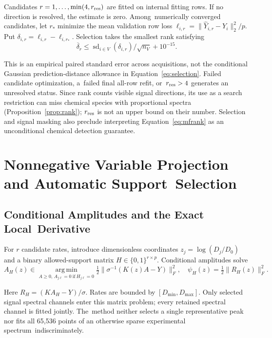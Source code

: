 \documentclass[mathematics,article,accept,moreauthors]{Definitions/mdpi}
\newcommand{\argmin}{\operatorname*{arg\,min}}
\begin{document}
Candidates $r=1,\ldots,\min(4,r_{\rm res})$ are fitted on internal fitting rows. If no direction is resolved, the estimate is zero. Among~numerically converged candidates, let $r_*$ minimize the mean validation row loss $\ell_{i,r}=\|\widehat Y_{i,r}-Y_i\|_2^2/p$. Put $\delta_{i,r}=\ell_{i,r}-\ell_{i,r_*}$. Selection takes the smallest rank satisfying
\begin{equation}\label{eq:mfselect}
 \overline\delta_r\leq
 \operatorname{sd}_{i\in V}(\delta_{i,r})/\sqrt{n_V}+10^{-15}.
\end{equation}

This is an empirical paired standard error across acquisitions, not the conditional Gaussian prediction-distance allowance in Equation~\eqref{eq:selection}. Failed candidate optimization, a~failed final all-row refit, or~$r_{\rm res}>4$ generates an unresolved status. Since rank counts visible signal directions, its use as a search restriction can miss chemical species with proportional spectra (Proposition~\ref{prop:rank}); $r_{\rm res}$ is not an upper bound on their number. Selection and signal masking also preclude interpreting Equation~\eqref{eq:mfrank} as an unconditional chemical detection guarantee.

%


\section{Nonnegative Variable Projection and Automatic Support~Selection}\label{sec:algorithm}

\subsection{Conditional Amplitudes and the Exact Local~Derivative}
For $r$ candidate rates, introduce dimensionless coordinates $z_j=\log(D_j/D_0)$ and a binary allowed-support matrix $H\in\{0,1\}^{r\times p}$. Conditional amplitudes solve
\begin{equation}\label{eq:nnls}
 A_H(z)\in\argmin_{A\geq0,\,A_{j\ell}=0\ \mathrm{if}\ H_{j\ell}=0}
 \tfrac12\|\sigma^{-1}(K(z)A-Y)\|_F^2,
 \quad \psi_H(z)=\tfrac12\|R_H(z)\|_F^2.
\end{equation}

Here $R_H=(KA_H-Y)/\sigma$. Rates are bounded by $[D_{\min},D_{\max}]$. Only selected signal spectral channels enter this matrix problem; every retained spectral channel is fitted jointly. The~method neither selects a single representative peak nor fits all 65,536 points of an otherwise sparse experimental spectrum~indiscriminately.
\end{document}
